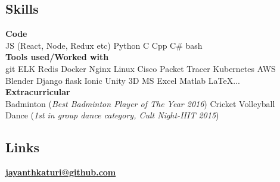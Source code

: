 \documentclass[letterpaper]{deedy-resume} %
\begin{document}

\lastupdated %



\begin{minipage}[t]{0.31\textwidth} %

\vspace{\topsep} %
\vspace{\topsep} %
\subsection{Skills}
\textbf{Code} \\
JS (React, Node, Redux etc) \textbullet{} Python \textbullet{} C \textbullet{} Cpp \textbullet{} C\# \textbullet{} bash \\
\textbf{Tools used/Worked with} \\
git \textbullet{} ELK \textbullet{} Redis \textbullet{} Docker
\textbullet{} Nginx \textbullet{} Linux \textbullet{} Cisco Packet Tracer
\textbullet{} Kubernetes \textbullet{} AWS \textbullet{} Blender 
\textbullet{} Django \textbullet{} flask \textbullet{} Ionic \textbullet{} Unity 3D
\textbullet{} MS Excel \textbullet{} Matlab \textbullet{} \LaTeX ... \\
\textbf{Extracurricular} \\
\textbullet{} Badminton (\textit{Best Badminton Player of The Year 2016}) \textbullet{}
Cricket \textbullet{} Volleyball \\
\textbullet{} Dance (\textit{1st in group dance category, Cult Night-IIIT 2015}) \\
\sectionspace

\subsection{Links} 
\href{https://github.com/jayanthkaturi}{\bf jayanthkaturi@github.com} \\
\sectionspace %


\end{minipage}
\end{document}
